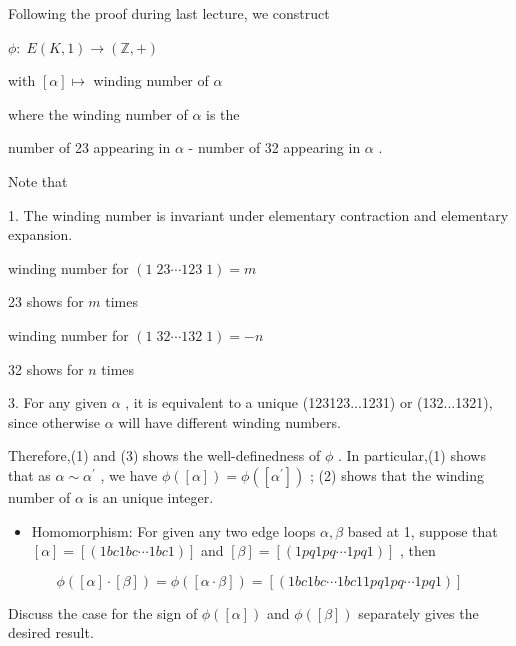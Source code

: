 Following the proof during last lecture, we construct

\(\phi  : \;E\left( {K,1}\right)  \rightarrow  \left( {\mathbb{Z}, + }\right)\)

with \(\left\lbrack  \alpha \right\rbrack   \mapsto\) winding number of \(\alpha\)

where the winding number of \(\alpha\) is the

number of 23 appearing in \(\alpha\) - number of 32 appearing in \(\alpha\) .

Note that

1. The winding number is invariant under elementary contraction and elementary expansion.

winding number for \(\left( {1\;{23}\cdots {123}\;1}\right)  = m\)

23 shows for \(m\) times

winding number for \(\left( {1\;{32}\cdots {132}\;1}\right)  =  - n\)

32 shows for \(n\) times

3. For any given \(\alpha\) , it is equivalent to a unique (123123...1231) or (132...1321), since otherwise \(\alpha\) will have different winding numbers.

Therefore,(1) and (3) shows the well-definedness of \(\phi\) . In particular,(1) shows that as \(\alpha  \sim  {\alpha }^{\prime }\) , we have \(\phi \left( \left\lbrack  \alpha \right\rbrack  \right)  = \phi \left( \left\lbrack  {\alpha }^{\prime }\right\rbrack  \right)\) ; (2) shows that the winding number of \(\alpha\) is an unique integer.

\begin{itemize}
\item Homomorphism: For given any two edge loops \(\alpha ,\beta\) based at 1, suppose that \(\left\lbrack  \alpha \right\rbrack   = \left\lbrack  \left( {{1bc1bc}\cdots {1bc1}}\right) \right\rbrack\) and \(\left\lbrack  \beta \right\rbrack   = \left\lbrack  \left( {{1pq1pq}\cdots {1pq1}}\right) \right\rbrack\) , then
\end{itemize}

\[
\phi \left( {\left\lbrack  \alpha \right\rbrack   \cdot  \left\lbrack  \beta \right\rbrack  }\right)  = \phi \left( \left\lbrack  {\alpha  \cdot  \beta }\right\rbrack  \right)  = \left\lbrack  \left( {{1bc1bc}\cdots {1bc11pq1pq}\cdots {1pq1}}\right) \right\rbrack
\]

Discuss the case for the sign of \(\phi \left( \left\lbrack  \alpha \right\rbrack  \right)\) and \(\phi \left( \left\lbrack  \beta \right\rbrack  \right)\) separately gives the desired result.

